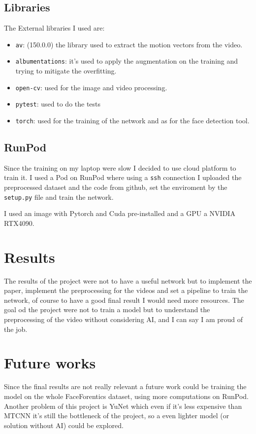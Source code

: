 \documentclass[a4paper,12pt]{article}
\begin{document}
\subsection{Libraries}
The External libraries I used are:
\begin{itemize}
    \item \texttt{av}: (150.0.0) the library used to extract the motion vectors from the video.
    \item \texttt{albumentations}: it's used to apply the augmentation on the training and trying to mitigate the overfitting.
    \item \texttt{open-cv}: used for the image and video processing.
    \item \texttt{pytest}: used to do the tests 
    \item \texttt{torch}: used for the training of the network and as for the face detection tool. 
\end{itemize}


\subsection{RunPod}
Since the training on my laptop were slow I decided to use cloud platform to train it. I used a Pod on RunPod where using a \texttt{ssh} connection I uploaded the preprocessed dataset and the code from github, set the enviroment by the \texttt{setup.py} file and train the network. 

I used an image with Pytorch and Cuda pre-installed and a GPU a NVIDIA RTX4090.

\section{Results}
The results of the project were not to have a useful network but to implement the paper, implement the preprocessing for the videos and set a pipeline to train the network, of course to have a good final result I would need more resources. The goal od the project were not to train a model but to understand the preprocessing of the video without considering AI, and I can say I am proud of the job.

\section{Future works}
Since the final results are not really relevant a future work could be training the model on the whole FaceForentics dataset, using more computations on RunPod. Another problem of this project is YuNet which even if it's less expensive than MTCNN it's still the bottleneck of the project, so a even lighter model (or solution without AI) could be explored.
\end{document}

